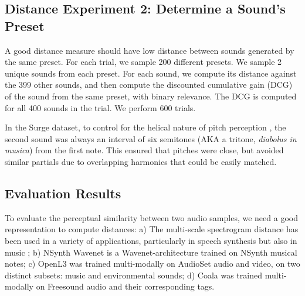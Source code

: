






\subsection{Distance Experiment 2: Determine a Sound's Preset}
\label{sec:experiment2}

A good distance measure should have low distance between sounds generated by the same preset. For each trial, we sample 200 different presets. We sample 2 unique sounds from each preset. For each sound, we compute its distance against the 399 other sounds, and then compute the discounted cumulative gain (DCG) \cite{pmlr-v30-Wang13} of the sound from the same preset, with binary relevance. The DCG is computed for all 400 sounds in the trial. We perform 600 trials.

In the Surge dataset, to control for the helical nature of pitch perception \cite{shepard1982geometrical}, the second sound was always an interval of six semitones (AKA a tritone, {\em diabolus in musica}) from the first note. This ensured that pitches were close, but avoided similar partials due to overlapping harmonics that could be easily matched.

\subsection{Evaluation Results}

To evaluate the perceptual similarity between two audio samples, we need a good representation to compute distances: a) The multi-scale spectrogram distance has been used in a variety of applications, particularly in speech synthesis \cite{wang_neural_2019,DBLP:conf/icassp/YamamotoSK20} but also in music \cite{DBLP:journals/corr/abs-2008-01393,engel2020ddsp,dhariwal2020jukebox};
b) NSynth Wavenet \cite{engel2017neural} is a Wavenet-architecture trained on NSynth musical notes; c) OpenL3 \cite{Cramer:LearnMore:ICASSP:19} was  trained multi-modally on AudioSet audio and video, on two distinct subsets: music and environmental sounds; d) Coala \cite{drossos:icml:2020} was trained multi-modally on Freesound audio and their corresponding tags.

